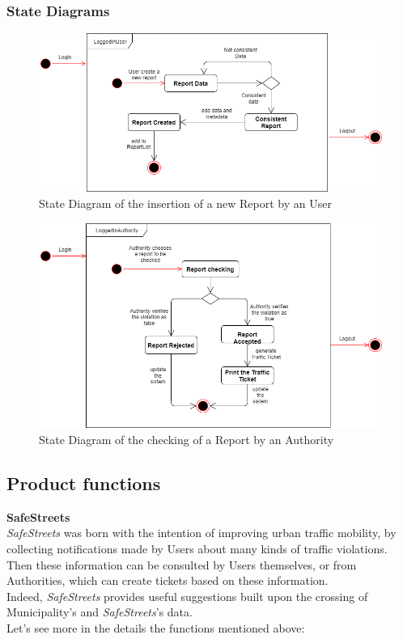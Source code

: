 \newpage

\subsubsection{State Diagrams}
    \begin{figure}[h]
        \centering
        \includegraphics[scale=0.5]{Images/StateDiag_addReport.png}
        \caption{State Diagram of the insertion of a new Report by an User}
    \end{figure}
    
    \vspace{30px}
    
    \begin{figure}[h!]
        \centering
        \includegraphics[scale=0.5]{Images/StateDiag_verifyReport.png}
        \caption{State Diagram of the checking of a Report by an Authority}
    \end{figure}


\subsection{Product
functions}

\textbf{SafeStreets}\\
\noindent\textit{SafeStreets} was born with the intention of improving urban traffic mobility, by collecting notifications made by Users about many kinds of traffic violations. Then these information can be consulted by Users themselves, or from Authorities, which can create tickets based on these information.\\ Indeed, \textit{SafeStreets} provides useful suggestions built upon the crossing of Municipality's and \textit{SafeStreets}'s data. \\
Let's see more in the details the functions mentioned above:\\\\

